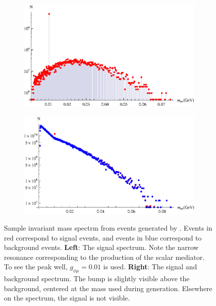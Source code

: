 \begin{figure}[t]
    \centering
    \begin{subfigure}[b]{0.45\textwidth}
        \centering
        \includegraphics[width=\textwidth]{Figures/spectra/mu_eeenunu_scalar}
        \label{fig:mu_eeenunu_scalar_spectrum}
    \end{subfigure}
    \begin{subfigure}[b]{0.45\textwidth}
        \centering
        \includegraphics[width=\textwidth]{Figures/spectra/mu_eeenunu_scalar_background}
        \label{fig:mu_eeenunu_scalar_background_spectrum}
    \end{subfigure}
    \caption{Sample invariant mass spectrm from events generated by \madgraph. Events in red correspond to signal events, and events in blue correspond to background events.
            \textbf{Left}: The signal spectrum. Note the narrow resonance corresponding to the production of the scalar mediator. To see the peak well, $g_{\phi\mu} = 0.01$ is used.
            \textbf{Right}: The signal and background spectrum. The bump is slightly visible above the background, centered at the mass used during generation. Elsewhere on the spectrum, the signal is not visible.}
    \label{fig:mu_eeenunu_spectrum}
\end{figure}


